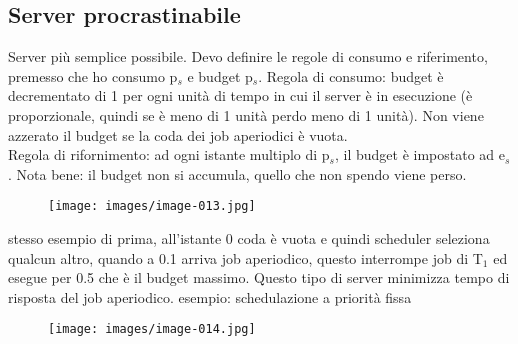 \documentclass[12pt, oneside]{extbook}
\begin{document}
\subsection{Server procrastinabile}
Server più semplice possibile. Devo definire le regole di consumo e riferimento, premesso che ho consumo p$_{s}$ e budget p$_{s}$. Regola di consumo: budget è decrementato di 1 per ogni unità di tempo in cui il server è in esecuzione (è proporzionale, quindi se è meno di 1 unità perdo meno di 1 unità). Non viene azzerato il budget se la coda dei job aperiodici è vuota.\\ Regola di rifornimento: ad ogni istante multiplo di p$_{s}$, il budget è impostato ad e$_{s}$. Nota bene: il budget non si accumula, quello che non spendo viene perso.\\
\begin{figure}[!h]
\centering
\texttt{[image: images/image-013.jpg]}
\end{figure}
stesso esempio di prima, all'istante 0 coda è vuota e quindi scheduler seleziona qualcun altro, quando a 0.1 arriva job aperiodico, questo interrompe job di T$_{1}$ ed esegue per 0.5 che è il budget massimo. Questo tipo di server minimizza tempo di risposta del job aperiodico. esempio: schedulazione a priorità fissa\\
\begin{figure}[!h]
\centering
\texttt{[image: images/image-014.jpg]}
\end{figure}
\end{document}

